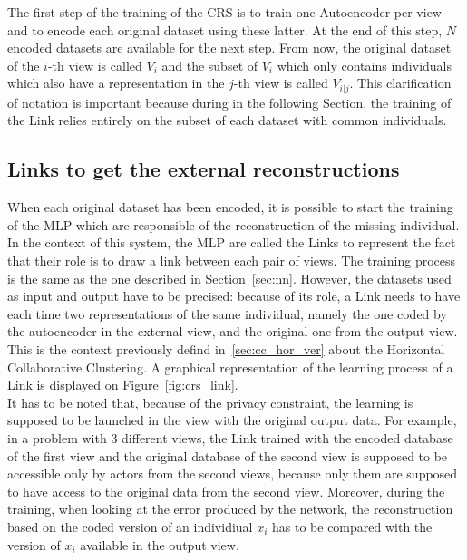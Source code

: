 \documentclass[a4paper]{report}
\begin{document}
    The first step of the training of the CRS is to train one Autoencoder per view and to encode each original dataset using these latter. At the end of this step, $N$ encoded datasets are available for the next step. From now, the original dataset of the $i$-th view is called $V_i$ and the subset of $V_i$ which only contains individuals which also have a representation in the $j$-th view is called $V_{i|j}$. This clarification of notation is important because during in the following Section, the training of the Link relies entirely on the subset of each dataset with common individuals.

    \subsection{Links to get the external reconstructions}

    When each original dataset has been encoded, it is possible to start the training of the MLP which are responsible of the reconstruction of the missing individual. In the context of this system, the MLP are called the Links to represent the fact that their role is to draw a link between each pair of views. The training process is the same as the one described in Section~\ref{sec:nn}. However, the datasets used as input and output have to be precised: because of its role, a Link needs to have each time two representations of the same individual, namely the one coded by the autoencoder in the external view, and the original one from the output view. This is the context previously defind in~\ref{sec:cc_hor_ver} about the Horizontal Collaborative Clustering. A graphical representation of the learning process of a Link is displayed on Figure~\ref{fig:crs_link}.\\
    
    It has to be noted that, because of the privacy constraint, the learning is supposed to be launched in the view with the original output data. For example, in a problem with 3 different views, the Link trained with the encoded database of the first view and the original database of the second view is supposed to be accessible only by actors from the second views, because only them are supposed to have access to the original data from the second view. Moreover, during the training, when looking at the error produced by the network, the reconstruction based on the coded version of an individiual $x_i$ has to be compared with the version of $x_i$ available in the output view.

    \vspace{0.8cm}
\end{document}
